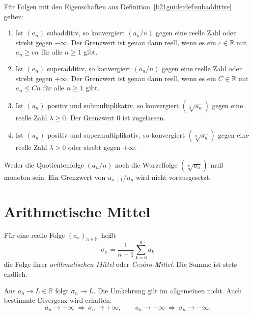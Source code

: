 \begin{theorem}
\label{b21guide:thm:fekete}
Für Folgen mit den Eigenschaften aus
Definition~\ref{b21guide:def:subadditive} gelten:
\begin{enumerate}
 \item Ist $(a_n)$ subadditiv, so konvergiert $(a_n/n)$
 gegen eine reelle Zahl oder strebt gegen $-\infty$.
 Der Grenzwert ist genau dann reell, wenn es ein $c\in\mathbb R$
 mit $a_n\geq cn$ für alle $n\geq1$ gibt.
 \item Ist $(a_n)$ superadditiv, so konvergiert $(a_n/n)$
 gegen eine reelle Zahl oder strebt gegen $+\infty$.
 Der Grenzwert ist genau dann reell, wenn es ein $C\in\mathbb R$
 mit $a_n\leq Cn$ für alle $n\geq1$ gibt.
 \item Ist $(u_n)$ positiv und submultiplikativ, so
 konvergiert $(\sqrt[n]{u_n})$ gegen eine reelle Zahl
 $\lambda\geq0$. Der Grenzwert $0$ ist zugelassen.
 \item Ist $(u_n)$ positiv und supermultiplikativ, so
 konvergiert $(\sqrt[n]{u_n})$ gegen eine reelle Zahl
 $\lambda>0$ oder strebt gegen $+\infty$.
\end{enumerate}
Weder die Quotientenfolge $(a_n/n)$ noch die Wurzelfolge
$(\sqrt[n]{u_n})$ muß monoton sein.
Ein Grenzwert von $u_{n+1}/u_n$ wird nicht vorausgesetzt.
\end{theorem}

\section{Arithmetische Mittel}

\begin{definition}
\label{b21guide:def:cesaro}
Für eine reelle Folge $(a_n)_{n\in\mathbb N}$ heißt
\[
 \sigma_n=\frac1{n+1}\sum_{k=0}^{n}a_k
\]
die Folge ihrer \emph{arithmetischen Mittel} oder
\emph{Cesàro-Mittel}. Die Summe ist stets endlich.
\end{definition}

\begin{theorem}
\label{b21guide:thm:cesaro}
Aus $a_n\to L\in\mathbb R$ folgt $\sigma_n\to L$.
Die Umkehrung gilt im allgemeinen nicht.
Auch bestimmte Divergenz wird erhalten:
\[
 a_n\to+\infty\ \Longrightarrow\ \sigma_n\to+\infty,
 \qquad
 a_n\to-\infty\ \Longrightarrow\ \sigma_n\to-\infty.
\]
\end{theorem}

